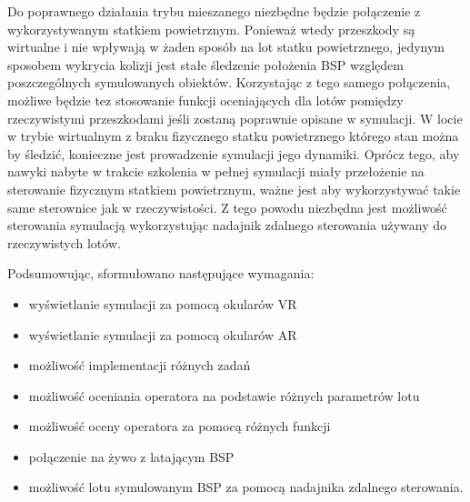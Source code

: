 Do poprawnego działania trybu mieszanego niezbędne będzie połączenie z wykorzystywanym statkiem powietrznym. Ponieważ wtedy przeszkody są wirtualne i nie wpływają w żaden sposób na lot statku powietrznego, jedynym sposobem wykrycia kolizji jest stałe śledzenie położenia BSP względem poszczególnych symulowanych obiektów. Korzystając z tego samego połączenia, możliwe będzie tez stosowanie funkcji oceniających dla lotów pomiędzy rzeczywistymi przeszkodami jeśli zostaną poprawnie opisane w symulacji. W locie w trybie wirtualnym z braku fizycznego statku powietrznego którego stan można by śledzić, konieczne jest prowadzenie symulacji jego dynamiki. Oprócz tego, aby nawyki nabyte w trakcie szkolenia w pełnej symulacji miały przełożenie na sterowanie fizycznym statkiem powietrznym, ważne jest aby wykorzystywać takie same sterownice jak w rzeczywistości. Z tego powodu niezbędna jest możliwość sterowania symulacją wykorzystując nadajnik zdalnego sterowania używany do rzeczywistych lotów.

Podsumowując, sformułowano następujące wymagania:
\begin{itemize}
  \item wyświetlanie symulacji za pomocą okularów VR
  \item wyświetlanie symulacji za pomocą okularów AR
  \item możliwość implementacji różnych zadań
  \item możliwość oceniania operatora na podstawie różnych parametrów lotu
  \item możliwość oceny operatora za pomocą różnych funkcji
  \item połączenie na żywo z latającym BSP
  \item możliwość lotu symulowanym BSP za pomocą nadajnika zdalnego sterowania.
\end{itemize}
